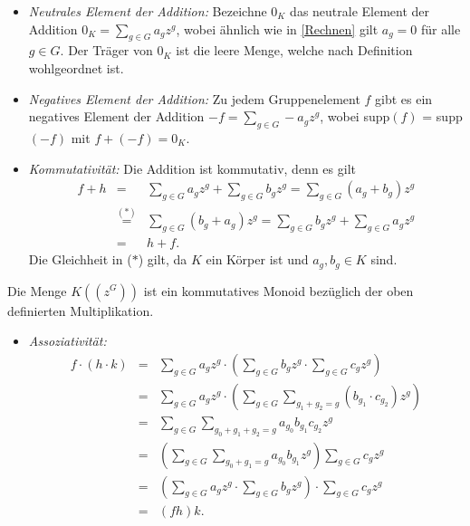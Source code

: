 {\begin{itemize}
\item \textit{Neutrales Element der Addition:} Bezeichne $0_K$ das neutrale Element der Addition $0_K = \sum_{g \in G}^{} a_g z^g$, wobei ähnlich wie in \ref{Rechnen} gilt $a_g = 0$ für alle $g \in G$. Der Träger von $0_K$ ist die leere Menge, welche nach Definition wohlgeordnet ist.
\item \textit{Negatives Element der Addition:} Zu jedem Gruppenelement $f$ gibt es ein negatives Element der Addition $-f = \sum_{g \in G}^{} -a_g z^g$, wobei supp$(f)$ = supp$(-f)$ mit $f+ \left(-f\right) = 0_K$.
\item \textit{Kommutativität:} 
Die Addition ist kommutativ, denn es gilt 
\begin{eqnarray*}
f+ h &=& \sum_{g \in G}^{} a_gz^g + \sum_{g \in G}^{} b_gz^g 
= \sum_{g \in G}^{} \left(a_g  + b_g\right) z^g \\
&\stackrel{\mathrm{(*)}}=& \sum_{g \in G}^{} \left(b_g  + a_g\right) z^g 
= \sum_{g \in G}^{} b_gz^g +  \sum_{g \in G}^{} a_gz^g \\
&=& h + f.
\end{eqnarray*}
Die Gleichheit in ($*$) gilt, da $K$ ein Körper ist und $a_g, b_g \in K$ sind.  
\end{itemize}
%
%
%
%
%
%
Die Menge $K\left(\left(z^{G}\right)\right)$ ist ein kommutatives Monoid bezüglich der oben definierten Multiplikation.
\begin{itemize}
\item \textit{Assoziativität:}
\begin{eqnarray*}
 f\cdot \left(h \cdot k\right) &= & \sum_{g \in G}^{} a_g z^g \cdot \left( \sum_{g \in G}^{} b_g z^g \cdot \sum_{g \in G}^{}c_g z^g \right) \\
&=& \sum_{g \in G}^{} a_g z^g \cdot \left( \sum_{g \in G}^{}\sum_{g_1 + g_2 = g}^{} \left(b_{g_1} \cdot c_{g_2}\right) z^g \right)\\
&=&  \sum_{g \in G}^{}\sum_{g_0 + g_1 + g_2  = g}^{} a_{g_0} b_{g_1} c_{g_2} z^g \\
& =& \left(\sum_{g \in G}^{}\sum_{g_0 + g_1 = g}^{} a_{g_0} b_{g_1}z^g\right) \sum_{g \in G}^{}c_g z^g   \\
&= &  \left(\sum_{g \in G}^{} a_g z^g \cdot \sum_{g \in G}^{} b_g z^g \right)\cdot \sum_{g \in G}^{}c_g z^g \\
&=& \left(fh\right) k .
\end{eqnarray*}
%
%
%
%
%

\end{itemize}}
